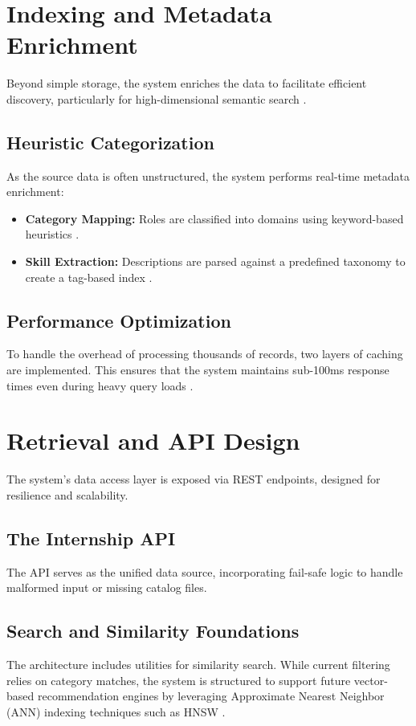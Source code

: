 \section{Indexing and Metadata Enrichment}
Beyond simple storage, the system enriches the data to facilitate efficient discovery, particularly for high-dimensional semantic search \cite{johnson2019billion, wang2021milvus}.

\subsection{Heuristic Categorization}
As the source data is often unstructured, the system performs real-time metadata enrichment:
\begin{itemize}
    \item \textbf{Category Mapping:} Roles are classified into domains using keyword-based heuristics \cite{boselli2018classifying}.
    \item \textbf{Skill Extraction:} Descriptions are parsed against a predefined taxonomy to create a tag-based index \cite{giabelli2021skills, bhola2020retrieving}.
\end{itemize}

\subsection{Performance Optimization}
To handle the overhead of processing thousands of records, two layers of caching are implemented. This ensures that the system maintains sub-100ms response times even during heavy query loads \cite{buttcher2016information, menghani2023efficient}.

\section{Retrieval and API Design}
The system's data access layer is exposed via REST endpoints, designed for resilience and scalability.

\subsection{The Internship API}
The API serves as the unified data source, incorporating fail-safe logic to handle malformed input or missing catalog files.

\subsection{Search and Similarity Foundations}
The architecture includes utilities for similarity search. While current filtering relies on category matches, the system is structured to support future vector-based recommendation engines by leveraging Approximate Nearest Neighbor (ANN) indexing techniques such as HNSW \cite{malkov2018efficient, johnson2019billion}.
